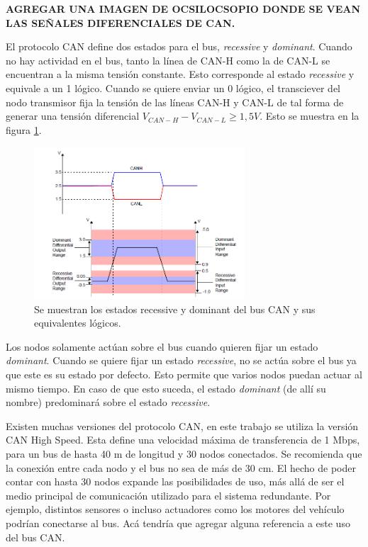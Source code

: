 \textbf{{\color{red} AGREGAR UNA IMAGEN DE OCSILOCSOPIO DONDE SE VEAN LAS SEÑALES DIFERENCIALES DE CAN.}}

El protocolo CAN define dos estados para el bus, \textit{recessive} y \textit{dominant}. Cuando no hay actividad en el bus, tanto la línea de CAN-H como la de CAN-L se encuentran a la misma tensión constante. Esto corresponde al estado \textit{recessive} y equivale a un 1 lógico. Cuando se quiere enviar un 0 lógico, el transciever del nodo transmisor fija la tensión de las líneas CAN-H y CAN-L de tal forma de generar una tensión diferencial $V_{CAN-H} - V_{CAN-L} \geq 1,5 V$. Esto se muestra en la figura \ref{fig:CAN_recessive_dominant}.

\begin{figure}[H]
    \centering
    \includegraphics[width=0.7\textwidth]{img/CAN_recessive_dominant.png}
    \caption{Se muestran los estados recessive y dominant del bus CAN y sus equivalentes lógicos.}
    \label{fig:CAN_recessive_dominant}    
\end{figure}

Los nodos solamente actúan sobre el bus cuando quieren fijar un estado \textit{dominant}. Cuando se quiere fijar un estado \textit{recessive}, no se actúa sobre el bus ya que este es su estado por defecto. Esto permite que varios nodos puedan actuar al mismo tiempo. En caso de que esto suceda, el estado \textit{dominant} (de allí su nombre) predominará sobre el estado \textit{recessive}.

Existen muchas versiones del protocolo CAN, en este trabajo se utiliza la versión CAN High Speed. Esta define una velocidad máxima de transferencia de 1 Mbps, para un bus de hasta 40 m de longitud y 30 nodos conectados. Se recomienda que la conexión entre cada nodo y el bus no sea de más de 30 cm. El hecho de poder contar con hasta 30 nodos expande las posibilidades de uso, más allá de ser el medio principal de comunicación utilizado para el sistema redundante. Por ejemplo, distintos sensores o incluso actuadores como los motores del vehículo podrían conectarse al bus. {\color{red} Acá tendría que agregar alguna referencia a este uso del bus CAN}.

